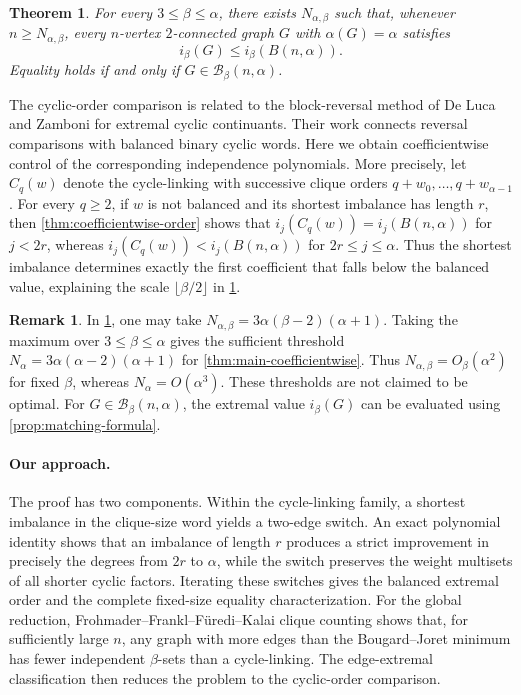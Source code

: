 \documentclass[11pt]{article}
\newtheorem{theorem}{Theorem}[section]
\theoremstyle{definition}
\newtheorem{remark}[remark]{Remark}
\begin{document}
\begin{theorem}\label{thm:fixed-size}
For every $3\le\beta\le\alpha$, there exists $N_{\alpha,\beta}$
such that, whenever $n\ge N_{\alpha,\beta}$, every $n$-vertex
$2$-connected graph $G$ with $\alpha(G)=\alpha$ satisfies
\[
 i_\beta(G)\le i_\beta(B(n,\alpha)).
\]
Equality holds if and only if $G\in\mathcal B_\beta(n,\alpha)$.
\end{theorem}
The cyclic-order comparison is related to the block-reversal method
of De Luca and Zamboni
\cite[Propositions~3.1 and~4.4]{DeLucaZamboni2021}
for extremal cyclic continuants. Their work connects reversal
comparisons with balanced binary cyclic words. Here we obtain
coefficientwise control of the corresponding independence
polynomials. More precisely, let $C_q(w)$ denote the cycle-linking
with successive clique orders $q+w_0,\ldots,q+w_{\alpha-1}$.
For every $q\ge2$, if $w$ is not balanced and its shortest imbalance
has length $r$, then \cref{thm:coefficientwise-order} shows that
$i_j(C_q(w))=i_j(B(n,\alpha))$ for $j<2r$, whereas
$i_j(C_q(w))<i_j(B(n,\alpha))$ for $2r\le j\le\alpha$.
Thus the shortest imbalance determines exactly the first coefficient
that falls below the balanced value, explaining the scale
$\lfloor\beta/2\rfloor$ in \cref{thm:fixed-size}.
\begin{remark}\label{rem:thresholds}
In \cref{thm:fixed-size}, one may take
$
N_{\alpha,\beta}=3\alpha(\beta-2)(\alpha+1).
$
Taking the maximum over $3\le\beta\le\alpha$ gives the sufficient
threshold
$
N_\alpha=3\alpha(\alpha-2)(\alpha+1)
$
for \cref{thm:main-coefficientwise}.
Thus $N_{\alpha,\beta}=O_\beta(\alpha^2)$ for fixed $\beta$,
whereas $N_\alpha=O(\alpha^3)$.
These thresholds are not claimed to be optimal.
For $G\in\mathcal B_\beta(n,\alpha)$, the extremal value
$i_\beta(G)$ can be evaluated using \cref{prop:matching-formula}.
\end{remark}

\paragraph{Our approach.}
The proof has two components. Within the cycle-linking family, a
shortest imbalance in the clique-size word yields a two-edge switch.
An exact polynomial identity shows that an imbalance of length $r$
produces a strict improvement in precisely the degrees from $2r$ to
$\alpha$, while the switch preserves the weight multisets of all
shorter cyclic factors. Iterating these switches gives the balanced
extremal order and the complete fixed-size equality characterization.
For the global reduction, Frohmader--Frankl--F\"uredi--Kalai clique
counting shows that, for sufficiently large $n$, any graph with more
edges than the Bougard--Joret minimum has fewer independent
$\beta$-sets than a cycle-linking. The edge-extremal classification
then reduces the problem to the cyclic-order comparison.
\end{document}
